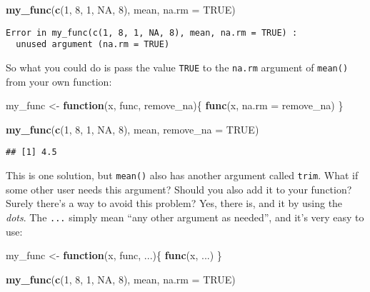 \documentclass[
]{article}
\newenvironment{Shaded}{\begin{snugshade}}{\end{snugshade}}
\newcommand{\ControlFlowTok}[1]{\textcolor[rgb]{0.13,0.29,0.53}{\textbf{#1}}}
\newcommand{\DataTypeTok}[1]{\textcolor[rgb]{0.13,0.29,0.53}{#1}}
\newcommand{\DecValTok}[1]{\textcolor[rgb]{0.00,0.00,0.81}{#1}}
\newcommand{\KeywordTok}[1]{\textcolor[rgb]{0.13,0.29,0.53}{\textbf{#1}}}
\newcommand{\NormalTok}[1]{#1}
\newcommand{\OtherTok}[1]{\textcolor[rgb]{0.56,0.35,0.01}{#1}}
\newcommand{\StringTok}[1]{\textcolor[rgb]{0.31,0.60,0.02}{#1}}
\begin{document}
\begin{Shaded}
\begin{Highlighting}[]
\KeywordTok{my\_func}\NormalTok{(}\KeywordTok{c}\NormalTok{(}\DecValTok{1}\NormalTok{, }\DecValTok{8}\NormalTok{, }\DecValTok{1}\NormalTok{, }\OtherTok{NA}\NormalTok{, }\DecValTok{8}\NormalTok{), mean, }\DataTypeTok{na.rm =} \OtherTok{TRUE}\NormalTok{)}
\end{Highlighting}
\end{Shaded}

\begin{verbatim}
Error in my_func(c(1, 8, 1, NA, 8), mean, na.rm = TRUE) :
  unused argument (na.rm = TRUE)
\end{verbatim}

So what you could do is pass the value \texttt{TRUE} to the \texttt{na.rm} argument of \texttt{mean()} from your own
function:

\begin{Shaded}
\begin{Highlighting}[]
\NormalTok{my\_func \textless{}{-}}\StringTok{ }\ControlFlowTok{function}\NormalTok{(x, func, remove\_na)\{}
  \KeywordTok{func}\NormalTok{(x, }\DataTypeTok{na.rm =}\NormalTok{ remove\_na)}
\NormalTok{\}}

\KeywordTok{my\_func}\NormalTok{(}\KeywordTok{c}\NormalTok{(}\DecValTok{1}\NormalTok{, }\DecValTok{8}\NormalTok{, }\DecValTok{1}\NormalTok{, }\OtherTok{NA}\NormalTok{, }\DecValTok{8}\NormalTok{), mean, }\DataTypeTok{remove\_na =} \OtherTok{TRUE}\NormalTok{)}
\end{Highlighting}
\end{Shaded}

\begin{verbatim}
## [1] 4.5
\end{verbatim}

This is one solution, but \texttt{mean()} also has another argument called \texttt{trim}. What if some other
user needs this argument? Should you also add it to your function? Surely there's a way to avoid
this problem? Yes, there is, and it by using the \emph{dots}. The \texttt{...} simply mean ``any other
argument as needed'', and it's very easy to use:

\begin{Shaded}
\begin{Highlighting}[]
\NormalTok{my\_func \textless{}{-}}\StringTok{ }\ControlFlowTok{function}\NormalTok{(x, func, ...)\{}
  \KeywordTok{func}\NormalTok{(x, ...)}
\NormalTok{\}}

\KeywordTok{my\_func}\NormalTok{(}\KeywordTok{c}\NormalTok{(}\DecValTok{1}\NormalTok{, }\DecValTok{8}\NormalTok{, }\DecValTok{1}\NormalTok{, }\OtherTok{NA}\NormalTok{, }\DecValTok{8}\NormalTok{), mean, }\DataTypeTok{na.rm =} \OtherTok{TRUE}\NormalTok{)}
\end{Highlighting}
\end{Shaded}
\end{document}
